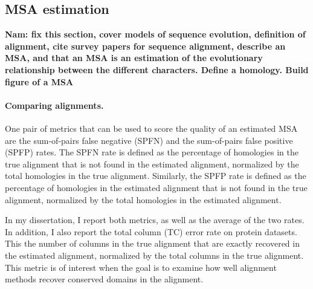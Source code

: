

\subsection{MSA estimation}\label{back:alignment}
\textbf{Nam:  fix this section, cover models of sequence evolution, definition of alignment, cite survey papers for sequence alignment, describe an MSA, and that an MSA is an estimation of the evolutionary relationship between the different characters.  Define a homology.  Build figure of a MSA}

\paragraph{Comparing alignments.}  One pair of metrics that can be used to score the quality of an estimated MSA are the sum-of-pairs false negative (SPFN) and the sum-of-pairs false positive (SPFP) rates.  The SPFN rate is defined as the percentage of homologies in the true alignment that is not found in the estimated alignment, normalized by the total homologies in the true alignment.  Similarly, the SPFP rate is defined as the percentage of homologies in the estimated alignment that is not found in the true alignment, normalized by the total homologies in the estimated alignment.  

In my dissertation, I report both metrics, as well as the average of the two rates.  In addition, I also report the total column (TC) error rate on protein datasets.  This the number of columns in the true alignment that are exactly recovered in the estimated alignment, normalized by the total columns in the true alignment.  This metric is of interest when the goal is to examine how well alignment methods recover conserved domains in the alignment.


